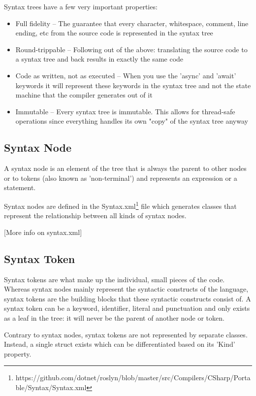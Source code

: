 Syntax trees have a few very important properties:

\begin{itemize}
	\item Full fidelity -- The guarantee that every character, whitespace, comment, line ending, etc from the source code is represented in the syntax tree
	\item Round-trippable -- Following out of the above: translating the source code to a syntax tree and back results in exactly the same code
	\item Code as written, not as executed -- When you use the 'async' and 'await' keywords it will represent these keywords in the syntax tree and not the state machine that the compiler generates out of it
	\item Immutable -- Every syntax tree is immutable. This allows for thread-safe operations since everything handles its own "copy" of the syntax tree anyway
\end{itemize}

\subsection{Syntax Node}
\label{sec:syntax-node}

A syntax node is an element of the tree that is always the parent to other nodes or to tokens (also known as 'non-terminal') and represents an expression or a statement. 

Syntax nodes are defined in the Syntax.xml\footnote{https://github.com/dotnet/roslyn/blob/master/src/Compilers/CSharp/Portable/Syntax/Syntax.xml} file which generates classes that represent the relationship between all kinds of syntax nodes. 

[More info on syntax.xml]

\subsection{Syntax Token}
\label{sec:syntax-token}

Syntax tokens are what make up the individual, small pieces of the code. Whereas syntax nodes mainly represent the syntactic constructs of the language, syntax tokens are the building blocks that these syntactic constructs consist of.
A syntax token can be a keyword, identifier, literal and punctuation and only exists as a leaf in the tree: it will never be the parent of another node or token.

Contrary to syntax nodes, syntax tokens are not represented by separate classes. Instead, a single struct exists which can be differentiated based on its 'Kind' property. 

